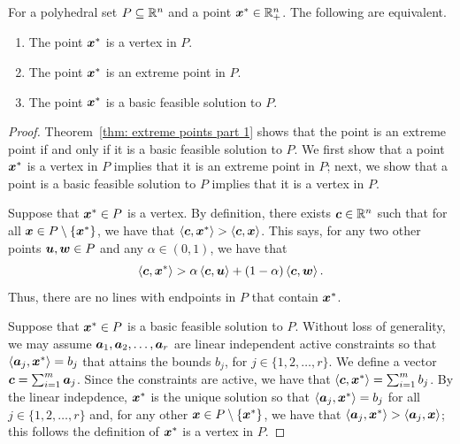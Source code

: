 \begin{theorem}\label{thm: unification}
For a polyhedral set $P\subseteq \mathbb R^{n}$ and a point ${\boldsymbol x}^\ast \in \mathbb R^{n}_+$. The following are equivalent. 
\begin{enumerate}[noitemsep]
\item The point ${\boldsymbol x}^\ast$ is a vertex in $P$. 
\item The point ${\boldsymbol x}^\ast$ is an extreme point in $P$. 
\item The point ${\boldsymbol x}^\ast$ is a basic feasible solution to $P$. 
\end{enumerate}
\end{theorem}
\begin{proof}
Theorem~\ref{thm: extreme points part 1} shows that the point is an extreme point if and only if it is a basic feasible solution to $P$. We first show that a point ${\boldsymbol x}^\ast$ is a vertex in $P$ implies that it is an extreme point in $P$; next, we show that a point is a basic feasible solution to $P$ implies that it is a vertex in $P$. 

Suppose that ${\boldsymbol x}^\ast\in P$ is a vertex. By definition, there exists ${\boldsymbol c}\in\mathbb R^{n}$ such that for all ${\boldsymbol x}\in P\setminus\{{\boldsymbol x}^\ast\}$, we have that $\left\langle{\boldsymbol c}, {\boldsymbol x}^\ast\right\rangle > \left\langle{\boldsymbol c}, {\boldsymbol x}\right\rangle$. This says, for any two other points ${\boldsymbol u}, {\boldsymbol w}\in P$ and any $\alpha \in (0, 1)$, we have that 
\[ \left\langle{\boldsymbol c}, {\boldsymbol x}^\ast\right\rangle > \alpha \left\langle{\boldsymbol c}, {\boldsymbol u}\right\rangle  + (1-\alpha) \left\langle{\boldsymbol c}, {\boldsymbol w}\right\rangle. \] 
Thus, there are no lines with endpoints in $P$ that contain ${\boldsymbol x}^\ast$. 

Suppose that ${\boldsymbol x}^\ast\in P$ is a basic feasible solution to $P$. Without loss of generality, we may assume ${\boldsymbol a}_1, {\boldsymbol a}_2, \dots, {\boldsymbol a}_r$ are linear independent active constraints so that $\left\langle{\boldsymbol a}_j, {\boldsymbol x}^\ast\right\rangle = b_j$ that attains the bounds $b_j$, for $j\in\{1, 2, \dots, r\}$. We define a vector ${\boldsymbol c} = \sum_{i = 1}^m {\boldsymbol a}_j$. Since the constraints are active, we have that  $\left\langle{\boldsymbol c}, {\boldsymbol x}^\ast\right\rangle = \sum_{i = 1}^m  b_j$. By the linear indepdence, ${\boldsymbol x}^\ast$ is the unique solution so that $\left\langle{\boldsymbol a}_j, {\boldsymbol x}^\ast\right\rangle = b_j$ for all $j\in\{1,2,\dots, r\}$ and, for any other ${\boldsymbol x} \in P\setminus\{{\boldsymbol x}^\ast\}$, we have that $ \left\langle{\boldsymbol a}_j, {\boldsymbol x}^\ast\right\rangle > \left\langle{\boldsymbol a}_j, {\boldsymbol x}\right\rangle$; this follows the definition of ${\boldsymbol x}^\ast$ is a vertex in $P$. 
\end{proof}

